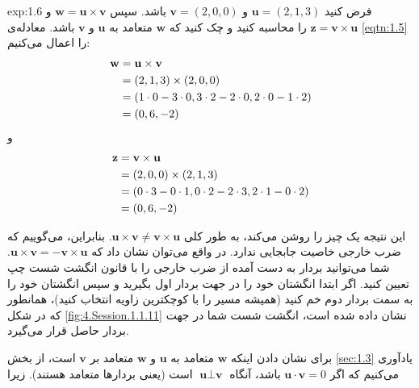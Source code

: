 {\begin{spacing}{1.5}
        \begin{example}{exp:1.6}
            فرض کنید $\textbf{u}=(2,1,3)$ و $\textbf{v}=(2,0,0)$ باشد. سپس $\textbf{w}=\textbf{u}\times\textbf{v}$ و $\textbf{z}=\textbf{v}\times\textbf{u}$ را محاسبه کنید و چک کنید که $\textbf{w}$ متعامد به $\textbf{u}$ و $\textbf{v}$ باشد. معادله‌ی \ref{eqtn:1.5} را اعمال می‌کنیم: \\
            \begin{equation*}
                \centering
                \begin{split}
                    \textbf{w}&=\textbf{u}\times\textbf{v}\\
                    &=(2,1,3)\times(2,0,0)\\
                    &=(1\cdot 0-3\cdot 0, 3\cdot 2-2\cdot 0, 2\cdot 0-1\cdot 2)\\
                    &=(0,6,-2)
                \end{split}
            \end{equation*}
            و
            \begin{equation*}
                \centering
                \begin{split}
                    \textbf{z}&=\textbf{v}\times\textbf{u}\\
                    &=(2,0,0)\times(2,1,3)\\
                    &=(0\cdot 3-0\cdot 1, 0\cdot 2-2\cdot 3, 2\cdot 1-0\cdot 2)\\
                    &=(0,6,-2)
                \end{split}
            \end{equation*}

            این نتیجه یک چیز را روشن می‌کند، به طور کلی $\textbf{u}\times\textbf{v}\neq\textbf{v}\times\textbf{u}$. بنابراین، می‌گوییم که ضرب خارجی خاصیت جابجایی ندارد.
            در واقع می‌توان نشان داد که $\textbf{u}\times\textbf{v}=-\textbf{v}\times\textbf{u}$. شما می‌توانید بردار به دست آمده از ضرب خارجی را با قانون انگشت شست چپ تعیین کنید.
            اگر ابتدا انگشتان خود را در جهت بردار اول بگیرید و سپس انگشتان خود را به سمت بردار دوم خم کنید (همیشه مسیر را با کوچکترین زاویه انتخاب کنید)، همانطور که در شکل \ref{fig:4.Session.1.1.11} نشان داده شده است، انگشت شست شما در جهت بردار حاصل قرار می‌گیرد.

            برای نشان دادن اینکه $\textbf{w}$ متعامد به $\textbf{u}$ و $\textbf{w}$ متعامد بر $\textbf{v}$ است،
            از بخش \ref{sec:1.3} یادآوری می‌کنیم که اگر $\textbf{u}\cdot\textbf{v}=0$ باشد،
            آنگاه $\textbf{u}\perp\textbf{v}$ است (یعنی بردارها متعامد هستند). زیرا


\end{example}
\end{spacing}}
